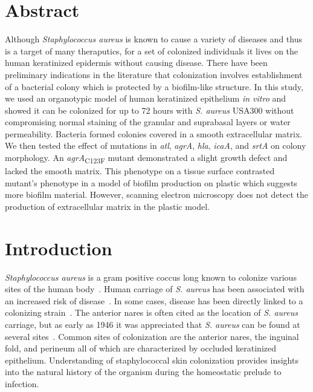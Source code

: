 \documentclass[10pt,letterpaper]{article}
\begin{document}
\section*{Abstract}
Although \textit{Staphylococcus aureus} is known to cause a variety of diseases and thus is a target of many theraputics, for a set of colonized individuals it lives on the human keratinized epidermis without causing disease.
There have been preliminary indications in the literature that colonization involves establishment of a bacterial colony which is protected by a biofilm-like structure.
In this study, we used an organotypic model of human keratinized epithelium \textit{in vitro} and showed it can be colonized for up to 72 hours with \textit{S. aureus} USA300 without compromising normal staining of the granular and suprabasal layers or water permeability.
Bacteria formed colonies covered in a smooth extracellular matrix.
We then tested the effect of mutations in \textit{atl}, \textit{agrA}, \textit{hla}, \textit{icaA}, and \textit{srtA} on colony morphology.
An \textit{agrA}\textsubscript{C123F} mutant demonstrated a slight growth defect and lacked the smooth matrix.
This phenotype on a tissue surface contrasted mutant's phenotype in a model of biofilm production on plastic which suggests more biofilm material.
However, scanning electron microscopy does not detect the production of extracellular matrix in the plastic model.


\linenumbers

\section*{Introduction}

\textit{Staphylococcus aureus} is a gram positive coccus long known to colonize various sites of the human body~\cite{miko_high_2012,williams_healthy_1963,mermel_methicillin-resistant_2011}.
Human carriage of \textit{S. aureus} has been associated with an increased risk of disease~\cite{wertheim_risk_2004}.
In some cases, disease has been directly linked to a colonizing strain~\cite{von_eiff_nasal_2001, toshkova_significance_2001}.
The anterior nares is often cited as the location of \textit{S. aureus} carriage, but as early as 1946 it was appreciated that \textit{S. aureus} can be found at several sites~\cite{williams_skin_1946}.
Common sites of colonization are the anterior nares, the inguinal fold, and perineum all of which are characterized by occluded keratinized epithelium.
Understanding of staphylococcal skin colonization provides insights into the natural history of the organism during the homeostatic prelude to infection.
\end{document}
